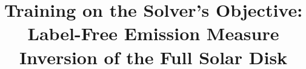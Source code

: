 \documentclass[10pt,twocolumn,letterpaper]{article}
\title{Training on the Solver's Objective:\\
Label-Free Emission Measure Inversion of the Full Solar Disk}
\author{}
\theoremstyle{plain}
\begin{document}
\maketitle








{
    \small
    
    
}

\end{document}
